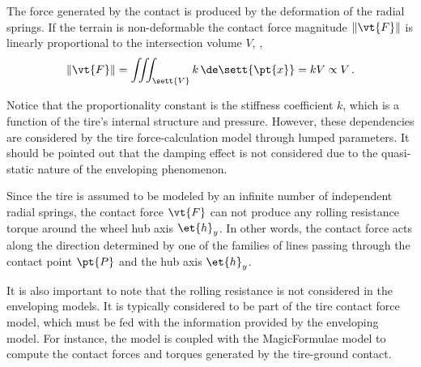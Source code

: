 \begin{observation}
  The force generated by the contact is produced by the deformation of the radial springs. If the terrain is non-deformable the contact force magnitude $\|\vt{F}\|$ is linearly proportional to the intersection volume $V$, \ie{},
  \begin{equation*}
    \| \vt{F} \| = \iiint_\sett{V} k \, \de\sett{\pt{x}} = k V \propto V \, \text{.}
  \end{equation*}
\end{observation}
%
Notice that the proportionality constant is the stiffness coefficient $k$, which is a function of the tire's internal structure and pressure. However, these dependencies are considered by the tire force-calculation model through lumped parameters. It should be pointed out that the damping effect is not considered due to the quasi-static nature of the enveloping phenomenon.
%
\begin{observation}
  Since the tire is assumed to be modeled by an infinite number of independent radial springs, the contact force $\vt{F}$ can not produce any rolling resistance torque around the wheel hub axis $\et{h}_y$. In other words, the contact force acts along the direction determined by one of the families of lines passing through the contact point $\pt{P}$ and the hub axis $\et{h}_y$.
\end{observation}
%
It is also important to note that the rolling resistance is not considered in the enveloping models. It is typically considered to be part of the tire contact force model, which must be fed with the information provided by the enveloping model. For instance, the \Swift{} model is coupled with the MagicFormulae{} model to compute the contact forces and torques generated by the tire-ground contact.

